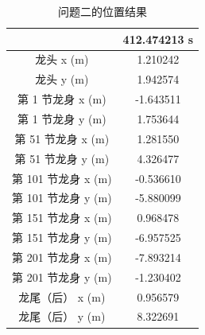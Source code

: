 \documentclass[a4paper]{article}
\begin{document}
        \begin{table}[H] %
        	\captionsetup{skip=4pt} %
        	\caption{问题二的位置结果}
        	\centering
        	\setlength{\arrayrulewidth}{0.5pt} %
        	\begin{tabular}{|c|c|} %
        		\hline
        						    & 412.474213 s \\ \hline
        		龙头 x (m)           &  1.210242 \\ \hline 
        		龙头 y (m)           &  1.942574 \\ \hline
        		第 1 节龙身 x (m)    &  -1.643511 \\ \hline 
        		第 1 节龙身 y (m)    &  1.753644 \\ \hline
        		第 51 节龙身 x (m)   &  1.281550 \\ \hline 
        		第 51 节龙身 y (m)   &  4.326477 \\ \hline
        		第 101 节龙身 x (m)  &  -0.536610 \\ \hline 
        		第 101 节龙身 y (m)  &  -5.880099 \\ \hline
        		第 151 节龙身 x (m)  &  0.968478 \\ \hline 
        		第 151 节龙身 y (m)  &  -6.957525 \\ \hline
        		第 201 节龙身 x (m)  &  -7.893214 \\ \hline 
        		第 201 节龙身 y (m)  &  -1.230402 \\ \hline
        		龙尾（后） x (m)     &  0.956579 \\ \hline 
        		龙尾（后） y (m)     &  8.322691 \\ \hline
        	\end{tabular}
        \end{table}
        
\end{document}
